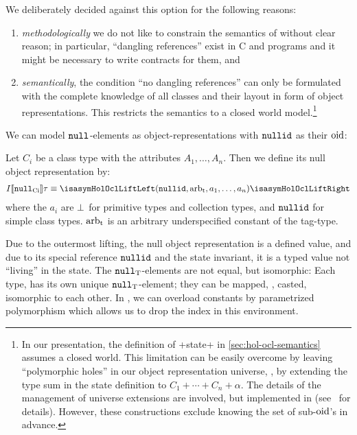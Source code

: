 We deliberately decided against this option for the following reasons:
\begin{enumerate}
\item \emph{methodologically} we do not like to constrain the semantics of \OCL
  without clear reason; in particular, ``dangling references'' exist in C and
  \Cpp{} programs and it might be necessary to write contracts for them, and
\item \emph{semantically}, the condition ``no dangling references'' can only be
  formulated with the complete knowledge of all classes and their layout in
  form of object representations.  This restricts the \OCL semantics to a closed
  world model.\footnote{In our presentation, the definition of \inlineocl+state+
    in \autoref{sec:hol-ocl-semantics} assumes a closed world. This limitation
    can be easily overcome by leaving ``polymorphic holes'' in our object
    representation universe, \ie, by extending the type sum in the state
    definition to $C_1 + \cdots + C_n + \alpha$.  The details of the management
    of universe extensions are involved, but implemented in \holocl
    (see~\cite{brucker.ea:extensible:2008-b} for details). However, these
    constructions exclude knowing the set of sub-$\mathrm{oid}$'s in advance.}
\end{enumerate} We can model ${\mathtt{null}_\text{{}}}$-elements as object-representations
with $\mathtt{nullid}$ as their $\mathrm{oid}$:
\begin{definition}
  Let $C_i$ be a class type with the attributes $A_1, \ldots, A_n$. Then we
  define its null object representation by:
  \begin{gather*}
    I\semantics{\Null{Ci}}\tau \equiv \lift{(\nullid, \Tag{arb}, a_1, \ldots,
    a_n )}
  \end{gather*}
  where the $a_i$ are $\bot$ for primitive types and collection
  types, and $\mathtt{nullid}$ for simple class types. $\mathrm{arb}_{\text{t}}$ is an arbitrary
  underspecified constant of the tag-type.
\end{definition}

Due to the outermost lifting, the null object representation is a defined value,
and due to its special reference $\mathtt{nullid}$ and the state invariant, it is a
typed value not ``living'' in the state.  The ${\mathtt{null}_\text{{T}}}$-elements are not equal,
but isomorphic: Each type, has its own unique ${\mathtt{null}_\text{{T}}}$-element; they can be
mapped, \ie, casted, isomorphic to each other. In \holocl, we can overload
constants by parametrized polymorphism which allows us to drop the index in this
environment.

